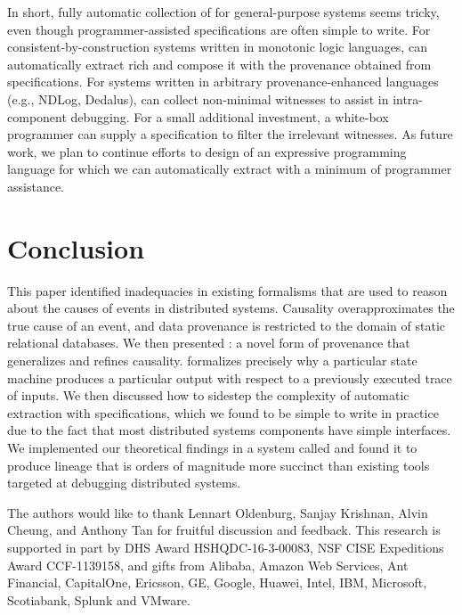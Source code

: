 In short, fully automatic collection of \watprovenance{} for general-purpose
systems seems tricky, even though programmer-assisted \watprovenance{}
specifications are often simple to write.  For consistent-by-construction
systems written in monotonic logic languages, \fluent{} can automatically
extract rich \watprovenance{} and compose it with the provenance obtained from
\watprovenance{} specifications.  For systems written in arbitrary
provenance-enhanced languages (e.g., NDLog, Dedalus), \fluent{} can collect
non-minimal witnesses to assist in intra-component debugging. For a small
additional investment, a white-box programmer can supply a \watprovenance{}
specification to filter the irrelevant witnesses. As future work, we plan to
continue efforts to design of an expressive programming language for which we
can automatically extract \watprovenance{} with a minimum of programmer
assistance.

\section{Conclusion}
This paper identified inadequacies in existing formalisms that are used to
reason about the causes of events in distributed systems. Causality
overapproximates the true cause of an event, and data provenance is restricted
to the domain of static relational databases.  We then presented
\watprovenance{}: a novel form of provenance that generalizes \whyprovenance{}
and refines causality. \Watprovenance{} formalizes precisely why a particular
state machine produces a particular output with respect to a previously
executed trace of inputs. We then discussed how to sidestep the complexity of
automatic \watprovenance{} extraction with \watprovenance{} specifications,
which we found to be simple to write in practice due to the fact that most
distributed systems components have simple interfaces. We implemented our
theoretical findings in a system called \fluent{} and found it to produce
lineage that is orders of magnitude more succinct than existing tools targeted
at debugging distributed systems.

\begin{acks}
  The authors would like to thank Lennart Oldenburg, Sanjay Krishnan, Alvin
  Cheung, and Anthony Tan for fruitful discussion and feedback.
  This research is supported in part by DHS Award HSHQDC-16-3-00083, NSF CISE
  Expeditions Award CCF-1139158, and gifts from Alibaba, Amazon Web Services, Ant
  Financial, CapitalOne, Ericsson, GE, Google, Huawei, Intel, IBM, Microsoft,
  Scotiabank, Splunk and VMware.
\end{acks}
